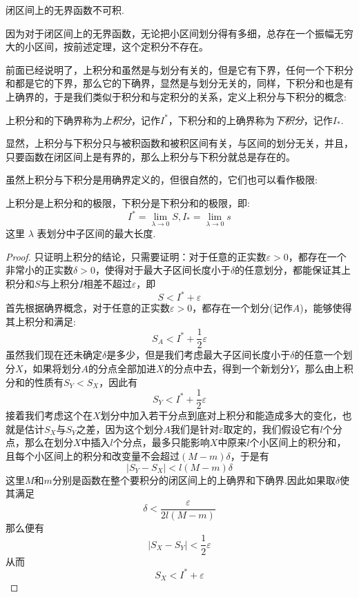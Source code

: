 \begin{inference}
  闭区间上的无界函数不可积.
\end{inference}
因为对于闭区间上的无界函数，无论把小区间划分得有多细，总存在一个振幅无穷大的小区间，按前述定理，这个定积分不存在。

前面已经说明了，上积分和虽然是与划分有关的，但是它有下界，任何一个下积分和都是它的下界，那么它的下确界，显然是与划分无关的，同样，下积分和也是有上确界的，于是我们类似于积分和与定积分的关系，定义上积分与下积分的概念:
\begin{definition}[上积分与下积分]
  上积分和的下确界称为\emph{上积分}，记作$I^{*}$，下积分和的上确界称为\emph{下积分}，记作$I_{*}$.
\end{definition}
显然，上积分与下积分只与被积函数和被积区间有关，与区间的划分无关，并且，只要函数在闭区间上是有界的，那么上积分与下积分就总是存在的。

虽然上积分与下积分是用确界定义的，但很自然的，它们也可以看作极限:
\begin{theorem}
  上积分是上积分和的极限，下积分是下积分和的极限，即:
  \[ I^{*} = \lim_{\lambda \to 0} S, I_{*} = \lim_{\lambda \to 0} s  \]
  这里 $\lambda$ 表划分中子区间的最大长度.
\end{theorem}

\begin{proof}
  只证明上积分的结论，只需要证明：对于任意的正实数$\varepsilon>0$，都存在一个非常小的正实数$\delta>0$，使得对于最大子区间长度小于$\delta$的任意划分，都能保证其上积分和$S$与上积分$I$相差不超过$\varepsilon$，即
  \[ S<I^{*}+ \varepsilon \]
  首先根据确界概念，对于任意的正实数$\varepsilon>0$，都存在一个划分(记作$A$)，能够使得其上积分和满足:
  \[ S_A<I^{*}+\frac{1}{2}\varepsilon \]
  虽然我们现在还未确定$\delta$是多少，但是我们考虑最大子区间长度小于$\delta$的任意一个划分$X$，如果将划分$A$的分点全部加进$X$的分点中去，得到一个新划分$Y$，那么由上积分和的性质有$S_Y<S_X$，因此有
  \[ S_Y<I^{*}+\frac{1}{2}\varepsilon \]
  接着我们考虑这个在$X$划分中加入若干分点到底对上积分和能造成多大的变化，也就是估计$S_X$与$S_Y$之差，因为这个划分$A$我们是针对$\varepsilon$取定的，我们假设它有$l$个分点，那么在划分$X$中插入$l$个分点，最多只能影响$X$中原来$l$个小区间上的积分和，且每个小区间上的积分和改变量不会超过$(M-m)\delta$，于是有
  \[ |S_Y-S_X|<l(M-m)\delta \]
  这里$M$和$m$分别是函数在整个要积分的闭区间上的上确界和下确界.因此如果取$\delta$使其满足
  \[ \delta < \frac{\varepsilon}{2l(M-m)} \]
  那么便有
  \[ |S_X-S_Y| < \frac{1}{2}\varepsilon \]
  从而
  \[ S_X < I^{*} + \varepsilon \]
\end{proof}

